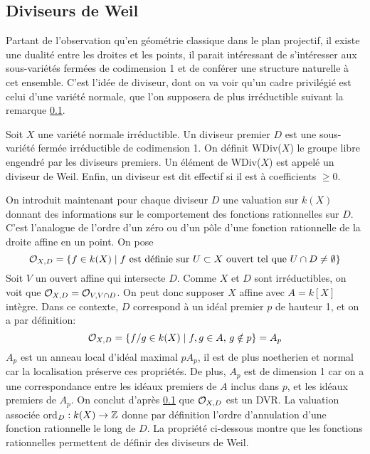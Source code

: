 \subsection{Diviseurs de Weil}

Partant de l'observation qu'en géométrie classique dans le plan projectif, il existe une dualité entre les droites et les points, il parait intéressant de s'intéresser aux sous-variétés fermées de codimension 1 et de conférer une structure naturelle à cet ensemble. C'est l'idée de diviseur, dont on va voir qu'un cadre privilégié est celui d'une variété normale, que l'on supposera de plus irréductible suivant la remarque \ref{}.

\begin{defn}
Soit $X$ une variété normale irréductible. Un diviseur premier $D$ est une sous-variété fermée irréductible de codimension 1. On définit WDiv($X$) le groupe libre engendré par les diviseurs premiers. Un élément de WDiv($X$) est appelé un diviseur de Weil. Enfin, un diviseur est dit effectif si il est à coefficients $\geq 0$. 
\end{defn}
On introduit maintenant pour chaque diviseur $D$ une valuation sur $k(X)$ donnant des informations sur le comportement des fonctions rationnelles sur $D$. C'est l'analogue de l'ordre d'un zéro ou d'un pôle d'une fonction rationnelle de la droite affine en un point. On pose $$\mathcal{O}_{X,D}=\lbrace f\in k(X)\mid f \textrm{ est définie sur } U\subset X \textrm{ ouvert tel que } U\cap D\neq \emptyset \rbrace$$
Soit $V$ un ouvert affine qui intersecte $D$. Comme $X$ et $D$ sont irréductibles, on voit que $\mathcal{O}_{X,D}=\mathcal{O}_{V,V\cap D}$. On peut donc supposer $X$ affine avec $A=k[X]$ intègre. Dans ce contexte, $D$ correspond à un idéal premier $p$ de hauteur 1, et on a par définition:$$\mathcal{O}_{X,D}=\lbrace f/g\in k(X)\mid f,g\in A,\, g\notin p \rbrace = A_p$$
$A_p$ est un anneau local d'idéal maximal $pA_p$, il est de plus noetherien et normal car la localisation préserve ces propriétés. De plus, $A_p$ est de dimension 1 car on a une correspondance entre les idéaux premiers de $A$ inclus dans $p$, et les idéaux premiers de $A_p$. On conclut d'après \ref{} que $\mathcal{O}_{X,D}$ est un DVR. La valuation associée ord$_D:k(X)\rightarrow \mathbb{Z}$ donne par définition l'ordre d'annulation d'une fonction rationnelle le long de $D$. La propriété ci-dessous montre que les fonctions rationnelles permettent de définir des diviseurs de Weil.

